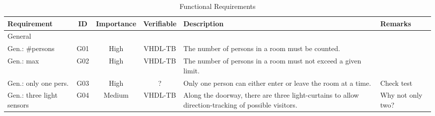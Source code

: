 \begin{table}[H]
\caption{Functional Requirements}
\label{tab:req01}
\centering
\begin{tabularx}{\textwidth}{|X |c |c |c |X |X |}
  \hline
  Requirement & ID & Importance & Verifiable & Description & Remarks \\
  \hline
  \hline
  General &&&&&\\
  \hline
  Gen.: \#persons & G01 & High & VHDL-TB & The number of persons in a room must be counted. & \\
  \hline
  Gen.: max & G02 & High & VHDL-TB & The number of persons in a room must not exceed a given limit. & \\
  \hline
  Gen.: only one pers. & G03 & High & ? & Only one person can either enter or leave the room at a time. & Check test \\
  \hline
  Gen.: three light sensors & G04 & Medium & VHDL-TB & Along the doorway, there are three light-curtains to allow direction-tracking of possible visitors. & Why not only two? \\
  \hline
\end{tabularx}
\end{table}
